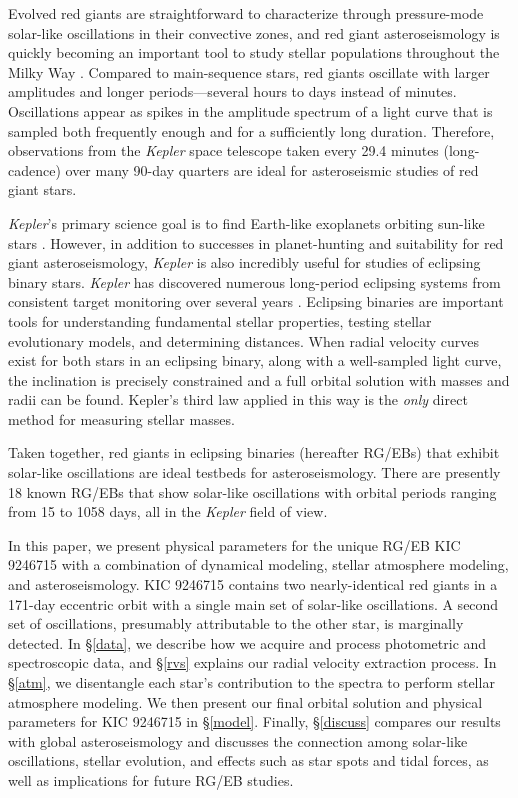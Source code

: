 Evolved red giants are straightforward to characterize through pressure-mode solar-like oscillations in their convective zones, and red giant asteroseismology is quickly becoming an important tool to study stellar populations throughout the Milky Way \citep[for a review of this topic, see][]{cha13}. Compared to main-sequence stars, red giants oscillate with larger amplitudes and longer periods---several hours to days instead of minutes. Oscillations appear as spikes in the amplitude spectrum of a light curve that is sampled both frequently enough and for a sufficiently long duration. Therefore, observations from the \emph{Kepler} space telescope taken every 29.4 minutes (long-cadence) over many 90-day quarters are ideal for asteroseismic studies of red giant stars.

\emph{Kepler}'s primary science goal is to find Earth-like exoplanets orbiting sun-like stars \citep{bor10}. However, in addition to successes in planet-hunting and suitability for red giant asteroseismology, \emph{Kepler} is also incredibly useful for studies of eclipsing binary stars. \emph{Kepler} has discovered numerous long-period eclipsing systems from consistent target monitoring over several years \citep{prs11,sla11}. Eclipsing binaries are important tools for understanding fundamental stellar properties, testing stellar evolutionary models, and determining distances. When radial velocity curves exist for both stars in an eclipsing binary, along with a well-sampled light curve, the inclination is precisely constrained and a full orbital solution with masses and radii can be found. Kepler's third law applied in this way is the \emph{only} direct method for measuring stellar masses.

Taken together, red giants in eclipsing binaries (hereafter RG/EBs) that exhibit solar-like oscillations are ideal testbeds for asteroseismology. There are presently 18 known RG/EBs that show solar-like oscillations \citep{hek10,gau13,gau14,bec14a,bec14b} with orbital periods ranging from 15 to 1058 days, all in the \emph{Kepler} field of view.

In this paper, we present physical parameters for the unique RG/EB KIC 9246715 with a combination of dynamical modeling, stellar atmosphere modeling, and asteroseismology. KIC 9246715 contains two nearly-identical red giants in a 171-day eccentric orbit with a single main set of solar-like oscillations. A second set of oscillations, presumably attributable to the other star, is marginally detected. In \S \ref{data}, we describe how we acquire and process photometric and spectroscopic data, and \S \ref{rvs} explains our radial velocity extraction process. In \S \ref{atm}, we disentangle each star's contribution to the spectra to perform stellar atmosphere modeling. We then present our final orbital solution and physical parameters for KIC 9246715 in \S \ref{model}. Finally, \S \ref{discuss} compares our results with global asteroseismology and discusses the connection among solar-like oscillations, stellar evolution, and effects such as star spots and tidal forces, as well as implications for future RG/EB studies.

  
  
  
